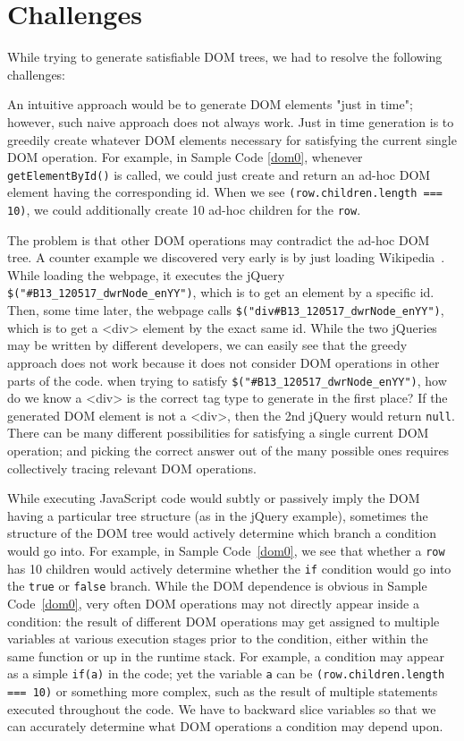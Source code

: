\section{Challenges}
While trying to generate satisfiable DOM trees, we had to resolve the following challenges:  

An intuitive approach would be to generate DOM elements "just in time"; however, such naive approach does not always work.  
Just in time generation is to greedily create whatever DOM elements necessary for satisfying the current single DOM operation.  
For example, in Sample Code \ref{dom0}, whenever {\tt getElementById()} is called, we could just create and return an ad-hoc DOM element having the corresponding id.  
When we see {\tt (row.children.length === 10)}, we could additionally create 10 ad-hoc children for the {\tt row}.  

The problem is that other DOM operations may contradict the ad-hoc DOM tree.  
A counter example we discovered very early is by just loading Wikipedia~\cite{wikipedia}.  
While loading the webpage, it executes the jQuery {\tt \$("\#B13\_120517\_dwrNode\_enYY")}, which is to get an element by a specific id.  
Then, some time later, the webpage calls {\tt \$("div\#B13\_120517\_dwrNode\_enYY")}, which is to get a <div> element by the exact same id.  
While the two jQueries may be written by different developers, we can easily see that the greedy approach does not work because it does not consider DOM operations in other parts of the code.
when trying to satisfy {\tt \$("\#B13\_120517\_dwrNode\_enYY")}, how do we know a <div> is the correct tag type to generate in the first place?  
If the generated DOM element is not a <div>, then the 2nd jQuery would return {\tt null}.  
There can be many different possibilities for satisfying a single current DOM operation; and picking the correct answer out of the many possible ones requires collectively tracing relevant DOM operations.  


While executing JavaScript code would subtly or passively imply the DOM having a particular tree structure (as in the jQuery example), sometimes the structure of the DOM tree would actively determine which branch a condition would go into.  
For example, in Sample Code~\ref{dom0}, we see that whether a {\tt row} has 10 children would actively determine whether the {\tt if} condition would go into the {\tt true} or {\tt false} branch.
While the DOM dependence is obvious in Sample Code~\ref{dom0}, very often DOM operations may not directly appear inside a condition: the result of different DOM operations may get assigned to multiple variables at various execution stages prior to the condition, either within the same function or up in the runtime stack.  
For example, a condition may appear as a simple {\tt if(a)} in the code; yet the variable {\tt a} can be {\tt (row.children.length === 10)} or something more complex, such as the result of multiple statements executed throughout the code.  
We have to backward slice variables so that we can accurately determine what DOM operations a condition may depend upon.


